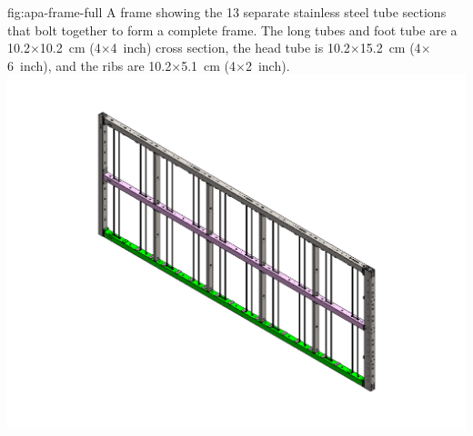 \begin{dunefigure}{fig:apa-frame-full}
{A   frame showing the \num{13} separate stainless steel tube sections that bolt together to form a complete frame.  The long tubes and foot tube are a \num{10.2}$\times$\SI{10.2}{cm} (\num{4}$\times$\SI{4}{inch}) cross section, the head tube is \num{10.2}$\times$\SI{15.2}{cm} (\num{4}$\times$\SI{6}{inch}), and the ribs are \num{10.2}$\times$\SI{5.1}{cm} (\num{4}$\times$\SI{2}{inch}). 
}
\includegraphics[width=1\textwidth]{graphics/sp-apa-frame-full-2.pdf}
\end{dunefigure}

